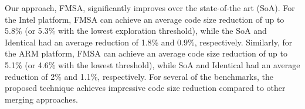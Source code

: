 Our approach, FMSA, significantly improves over the state-of-the art (SoA). For the Intel platform, FMSA can achieve an average code size
reduction of up to 5.8\% (or 5.3\% with the lowest exploration threshold), while the SoA and Identical had an average reduction of 1.8\% and 0.9\%,
respectively. Similarly, for the ARM platform, FMSA can achieve an average code size reduction of up to 5.1\% (or 4.6\% with the lowest
threshold), while SoA and Identical had an average reduction of 2\% and 1.1\%, respectively. For several of the benchmarks, the
proposed technique achieves impressive code size reduction compared to other merging approaches.


